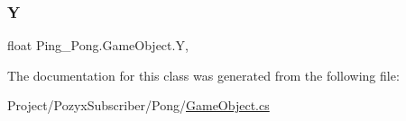 \mbox{\label{class_ping___pong_1_1_game_object_adf561c4e05f7c2f4032d8302e01a3967}} 
\subsubsection{\texorpdfstring{Y}{Y}}
{\footnotesize\ttfamily float Ping\+\_\+\+Pong.\+Game\+Object.\+Y\hspace{0.3cm}{\ttfamily [get]}, {\ttfamily [set]}}



The documentation for this class was generated from the following file\+:\begin{DoxyCompactItemize}
\item 
Project/\+Pozyx\+Subscriber/\+Pong/\hyperlink{_game_object_8cs}{Game\+Object.\+cs}\end{DoxyCompactItemize}
